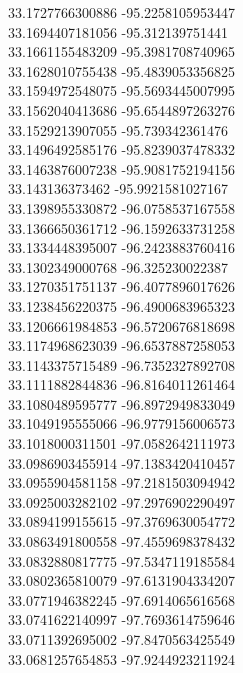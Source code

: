 {33.1727766300886	-95.2258105953447\\
33.1694407181056	-95.312139751441\\
33.1661155483209	-95.3981708740965\\
33.1628010755438	-95.4839053356825\\
33.1594972548075	-95.5693445007995\\
33.1562040413686	-95.6544897263276\\
33.1529213907055	-95.739342361476\\
33.1496492585176	-95.8239037478332\\
33.1463876007238	-95.9081752194156\\
33.143136373462	-95.9921581027167\\
33.1398955330872	-96.0758537167558\\
33.1366650361712	-96.1592633731258\\
33.1334448395007	-96.2423883760416\\
33.1302349000768	-96.325230022387\\
33.1270351751137	-96.4077896017626\\
33.1238456220375	-96.4900683965323\\
33.1206661984853	-96.5720676818698\\
33.1174968623039	-96.6537887258053\\
33.1143375715489	-96.7352327892708\\
33.1111882844836	-96.8164011261464\\
33.1080489595777	-96.8972949833049\\
33.1049195555066	-96.9779156006573\\
33.1018000311501	-97.0582642111973\\
33.0986903455914	-97.1383420410457\\
33.0955904581158	-97.2181503094942\\
33.0925003282102	-97.2976902290497\\
33.0894199155615	-97.3769630054772\\
33.0863491800558	-97.4559698378432\\
33.0832880817775	-97.5347119185584\\
33.0802365810079	-97.6131904334207\\
33.0771946382245	-97.6914065616568\\
33.0741622140997	-97.7693614759646\\
33.0711392695002	-97.8470563425549\\
33.0681257654853	-97.9244923211924\\
}
